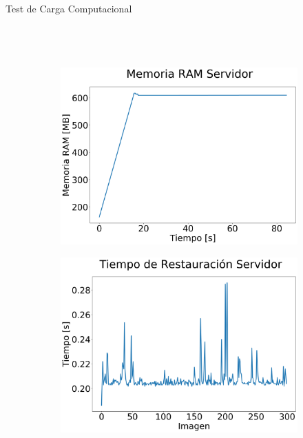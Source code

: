 \documentclass[12pt,aspectratio=169]{beamer}
\begin{document}
\begin{frame}{Test de Carga Computacional}
\begin{columns}[c]
\begin{figure}
\begin{subfigure}{0.45\textwidth}
            \end{subfigure}
            \\
            \begin{subfigure}{0.45\textwidth}
                \centering
                \includegraphics[scale=0.11]{figs/RAM Servidor.png}
            \end{subfigure}
            \begin{subfigure}{0.45\textwidth}
                \centering
                \includegraphics[scale=0.11]{figs/Tiempo Servidor.png}
            \end{subfigure}

\end{figure}
\end{columns}
\end{frame}
\end{document}
